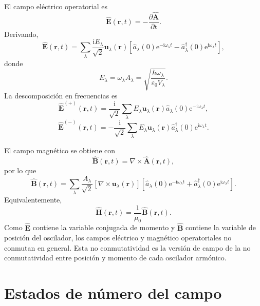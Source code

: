 \documentclass[11pt]{article}
\newcommand{\ii}{\mathrm{i}}
\newcommand{\ee}{\mathrm{e}}
\newcommand{\vb}[1]{\mathbf{#1}}
\begin{document}
El campo el\'ectrico operatorial es
\begin{equation}
  \hat{\vb E}(\vb r,t)
  =
  -\frac{\partial\hat{\vb A}}{\partial t}.
\end{equation}
Derivando,
\begin{equation}
  \boxed{
  \hat{\vb E}(\vb r,t)
  =
  \sum_\lambda
  \frac{\ii E_\lambda}{\sqrt2}
  \vb u_\lambda(\vb r)
  \left[
  \hat a_\lambda(0)\ee^{-\ii\omega_\lambda t}
  -
  \hat a_\lambda^\dagger(0)\ee^{\ii\omega_\lambda t}
  \right],
  }
\end{equation}
donde
\begin{equation}
  E_\lambda=\omega_\lambda A_\lambda
  =
  \sqrt{\frac{\hbar\omega_\lambda}{\varepsilon_0V_\lambda}}.
\end{equation}
La descomposici\'on en frecuencias es
\begin{equation}
  \hat{\vb E}^{(+)}(\vb r,t)
  =
  \frac{\ii}{\sqrt2}
  \sum_\lambda
  E_\lambda
  \vb u_\lambda(\vb r)
  \hat a_\lambda(0)\ee^{-\ii\omega_\lambda t},
\end{equation}
\begin{equation}
  \hat{\vb E}^{(-)}(\vb r,t)
  =
  -\frac{\ii}{\sqrt2}
  \sum_\lambda
  E_\lambda
  \vb u_\lambda(\vb r)
  \hat a_\lambda^\dagger(0)\ee^{\ii\omega_\lambda t}.
\end{equation}

El campo magn\'etico se obtiene con
\begin{equation}
  \hat{\vb B}(\vb r,t)=\nabla\times\hat{\vb A}(\vb r,t),
\end{equation}
por lo que
\begin{equation}
  \boxed{
  \hat{\vb B}(\vb r,t)
  =
  \sum_\lambda
  \frac{A_\lambda}{\sqrt2}
  [\nabla\times\vb u_\lambda(\vb r)]
  \left[
  \hat a_\lambda(0)\ee^{-\ii\omega_\lambda t}
  +
  \hat a_\lambda^\dagger(0)\ee^{\ii\omega_\lambda t}
  \right].
  }
\end{equation}
Equivalentemente,
\begin{equation}
  \hat{\vb H}(\vb r,t)
  =
  \frac{1}{\mu_0}
  \hat{\vb B}(\vb r,t).
\end{equation}
Como $\hat{\vb E}$ contiene la variable conjugada de momento y
$\hat{\vb B}$ contiene la variable de posici\'on del oscilador, los campos
el\'ectrico y magn\'etico operatoriales no conmutan en general. Esta no
conmutatividad es la versi\'on de campo de la no conmutatividad entre
posici\'on y momento de cada oscilador arm\'onico.

\section{Estados de n\'umero del campo}
\end{document}
